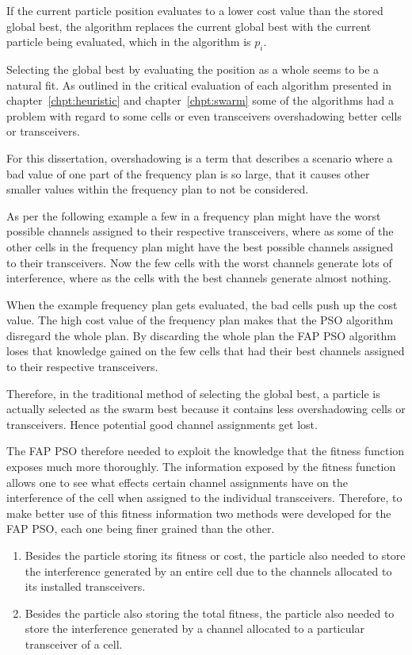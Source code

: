 If the current particle position evaluates to a lower cost value than the stored global best, the algorithm replaces the current global best with the current particle being evaluated, which in the algorithm is $p_i$.

Selecting the global best by evaluating the position as a whole seems to be a natural fit. As outlined in the critical evaluation of each algorithm presented in chapter~\ref{chpt:heuristic} and chapter~\ref{chpt:swarm} some of the algorithms had a problem with regard to some cells or even transceivers overshadowing better cells or transceivers.

For this dissertation, overshadowing is a term that describes a scenario where a bad value of one part of the frequency plan is so large, that it causes other smaller values within the frequency plan to not be considered. 

As per the following example a few in a frequency plan might have the worst possible channels assigned to their respective transceivers, where as some of the other cells in the frequency plan might have the best possible channels assigned to their transceivers. Now the few cells with the worst channels generate lots of interference, where as the cells with the best channels generate almost nothing.

When the example frequency plan gets evaluated, the bad cells push up the cost value. The high cost value of the frequency plan makes that the PSO algorithm disregard the whole plan. By discarding the whole plan the FAP PSO algorithm loses that knowledge gained on the few cells that had their best channels assigned to their respective transceivers.

Therefore, in the traditional method of selecting the global best, a particle is actually selected as the swarm best because it contains less overshadowing cells or transceivers. Hence potential good channel assignments get lost.

The FAP PSO therefore needed to exploit the knowledge that the fitness function exposes much more thoroughly. The information exposed by the fitness function allows one to see what effects certain channel assignments have on the interference of the cell when assigned to the individual transceivers. Therefore, to make better use of this fitness information two methods were developed for the FAP PSO, each one being finer grained than the other.

\begin{enumerate}
\item Besides the particle storing its fitness or cost, the particle also needed to store the interference generated by an entire cell due to the channels allocated to its installed transceivers.
\item Besides the particle also storing the total fitness, the particle also needed to store the interference generated by a channel allocated to a particular transceiver of a cell.
\end{enumerate}


